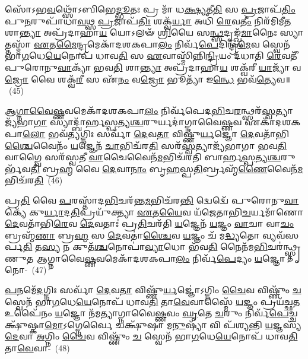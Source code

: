 𑌸𑍋᳴\-𑌽𑌭\-\ul{𑌵}\-𑌥𑍍𑌸𑍋᳴\-𑌽𑌬𑌿𑌭𑍇\-\ul{𑌦𑍍𑌭𑍂}\-𑌤𑌃 𑌪𑍍𑌰 𑌮𑌾᳴ 𑌧\-\ul{𑌕𑍍𑌷𑍍𑌯}\-𑌤𑍀\-\ul{𑌤𑌿} 𑌸 \ul{𑌪𑍍𑌰}\-𑌜𑌾𑌪᳴\-\ul{𑌤𑌿𑌂} 𑌪𑍁\-\ul{𑌨}\-𑌰𑍁𑌪𑌾᳴𑌧𑌾\-\ul{𑌵}\-𑌥𑍍𑌸 \ul{𑌪𑍍𑌰}\-𑌜𑌾𑌪᳴\-\ul{𑌤𑌿𑌃} 𑌶𑌕𑍍𑌵᳴\-\ul{𑌰𑍍𑌯𑌾} 𑌅𑌧𑌿᳴ \ul{𑌰𑍇}\-𑌵\-\ul{𑌤𑍀𑌂} 𑌨𑌿𑌰᳴𑌮𑌿𑌮𑍀\-\ul{𑌤} 𑌶𑌾\-\ul{𑌨𑍍𑌤𑍍𑌯𑌾} 𑌅𑌪𑍍𑌰᳴𑌦𑌾𑌹𑌾\-\ul{𑌯} 𑌯𑍋\-𑌽𑌲𑍟᳴ \ul{𑌶𑍍𑌰𑌿}\-𑌯𑍈 𑌸\-\ul{𑌨𑍍𑌥𑍍𑌸}\-𑌦𑍃𑌙𑍍𑌖𑍍𑌸᳴\-\ul{𑌮𑌾}\-𑌨𑍈𑌃 𑌸𑍍𑌯𑌾𑌤𑍍𑌤𑌸𑍍𑌮𑌾᳴ \ul{𑌏}\-𑌤\-\ul{𑌮𑍈}\-𑌨𑍍𑌦𑍍𑌰𑌮𑍇𑌕𑌾᳴\-𑌦𑌶\-𑌕𑌪𑌾\-\ul{𑌲𑌂} 𑌨𑌿𑌰𑍍𑌵᳴\-\ul{𑌪𑍇}\-𑌦𑌿𑌨𑍍𑌦𑍍𑌰᳴\-\ul{𑌮𑍇}\-𑌵 𑌸𑍍𑌵𑍇𑌨᳴ 𑌭𑌾\-\ul{𑌗}\-𑌧𑍇\-\ul{𑌯𑍇}\-𑌨𑍋𑌪᳴ 𑌧𑌾𑌵\-\ul{𑌤𑌿} 𑌸 \ul{𑌏}\-𑌵𑌾𑌸𑍍𑌮𑌿᳴𑌨𑍍𑌨𑌿\-\ul{𑌨𑍍𑌦𑍍𑌰𑌿}\-𑌯𑌂 𑌦᳴𑌧𑌾𑌤𑌿 \ul{𑌰𑍇}\-𑌵𑌤𑍀᳴ 𑌪𑍁𑌰𑍋𑌨𑍁\-\ul{𑌵𑌾}\-𑌕𑍍𑌯𑌾᳴ 𑌭𑌵\-\ul{𑌤𑌿} 𑌶𑌾\-\ul{𑌨𑍍𑌤𑍍𑌯𑌾} 𑌅𑌪𑍍𑌰᳴𑌦𑌾𑌹𑌾\-\ul{𑌯} 𑌶𑌕𑍍𑌵᳴𑌰𑍀 \ul{𑌯𑌾}\-𑌜𑍍𑌯𑌾᳴ 𑌵\-\ul{𑌜𑍍𑌰𑍋} 𑌵𑍈 𑌶𑌕𑍍𑌵᳴\-\ul{𑌰𑍀} 𑌸 𑌏᳴\-\ul{𑌨𑌂} 𑌵\-\ul{𑌜𑍍𑌰𑍋} 𑌭𑍂𑌤𑍍𑌯𑌾᳴ 𑌇\-\ul{𑌨𑍍𑌧𑍇} 𑌭𑌵᳴\-\ul{𑌤𑍍𑌯𑍇}\-𑌵॥~(45)

{\anuvakamend[{𑌅\-\ul{𑌪𑌿} 𑌤𑍟 𑌸𑍍𑌯𑍁᳴𑌰𑍍𑌵𑍈𑌨𑍍𑌧 𑌭𑌵\-\ul{𑌤𑌿} 𑌚𑌤𑍁᳴𑌰𑍍𑌦𑌶 𑌚}]}%

\-\ul{𑌆}\-\-\ul{𑌗𑍍𑌨𑌾}\-\-\ul{𑌵𑍈}\-\-\ul{𑌷𑍍𑌣}\-𑌵𑌮𑍇𑌕𑌾᳴𑌦𑌶𑌕𑌪𑌾\-\ul{𑌲𑌂} 𑌨𑌿𑌰𑍍𑌵᳴𑌪𑍇𑌦\-\ul{𑌭𑌿}\-𑌚\-\ul{𑌰}\-𑌨𑍍𑌥𑍍𑌸𑌰᳴\-\ul{𑌸𑍍𑌵}\-𑌤𑍍𑌯𑌾𑌜𑍍𑌯᳴\-𑌭𑌾\-\ul{𑌗𑌾} 𑌸𑍍𑌯𑌾𑌦𑍍𑌬𑌾᳴𑌰𑍍\mbox{}𑌹\-\ul{𑌸𑍍𑌪}\-𑌤𑍍𑌯\-\ul{𑌶𑍍𑌚}\-𑌰𑍁𑌰𑍍𑌯𑌦𑌾॑𑌗𑍍𑌨𑌾𑌵𑍈\-\ul{𑌷𑍍𑌣}\-𑌵 𑌏𑌕𑌾᳴\-𑌦𑌶\-𑌕𑌪𑌾\-\ul{𑌲𑍋} 𑌭𑌵᳴\-\ul{𑌤𑍍𑌯}\-𑌗𑍍𑌨𑌿𑌃 𑌸𑌰𑍍𑌵𑌾᳴ \ul{𑌦𑍇}\-𑌵\-\ul{𑌤𑌾} 𑌵𑌿𑌷𑍍𑌣𑍁᳴\-\ul{𑌰𑍍𑌯}\-𑌜𑍍𑌞𑍋 \ul{𑌦𑍇}\-𑌵𑌤𑌾᳴𑌭𑌿\-\ul{𑌶𑍍𑌚𑍈}\-𑌵𑍈𑌨𑌂᳴ \ul{𑌯}\-𑌜𑍍𑌞𑍇𑌨᳴ \ul{𑌚𑌾}\-𑌭𑌿𑌚᳴𑌰\-\ul{𑌤𑌿} 𑌸𑌰᳴\-\ul{𑌸𑍍𑌵}\-𑌤𑍍𑌯𑌾𑌜𑍍𑌯᳴𑌭𑌾𑌗𑌾 𑌭𑌵\-\ul{𑌤𑌿} 𑌵𑌾𑌗𑍍𑌵𑍈 𑌸𑌰᳴𑌸𑍍𑌵𑌤𑍀 \ul{𑌵𑌾}\-𑌚𑍈𑌵𑍈𑌨᳴\-\ul{𑌮}\-𑌭𑌿𑌚᳴𑌰𑌤𑌿 𑌬𑌾𑌰𑍍\mbox{}𑌹\-\ul{𑌸𑍍𑌪}\-𑌤𑍍𑌯\-\ul{𑌶𑍍𑌚}\-𑌰𑍁𑌰𑍍𑌭᳴𑌵\-\ul{𑌤𑌿} 𑌬𑍍𑌰\-\ul{𑌹𑍍𑌮} 𑌵𑍈 \ul{𑌦𑍇}\-𑌵𑌾\-\ul{𑌨𑌾𑌂} 𑌬𑍃\-\ul{𑌹}\-𑌸𑍍𑌪\-\ul{𑌤𑌿}\-𑌰𑍍𑌬𑍍𑌰𑌹𑍍𑌮᳴\-\ul{𑌣𑍈}\-𑌵𑍈𑌨᳴\-\ul{𑌮}\-𑌭𑌿𑌚᳴𑌰\-\ul{𑌤𑌿}\-~(46)

𑌪𑍍𑌰\-\ul{𑌤𑌿} 𑌵𑍈 \ul{𑌪}\-𑌰𑌸𑍍𑌤𑌾᳴𑌦\-\ul{𑌭𑌿}\-𑌚𑌰᳴𑌨𑍍𑌤\-\ul{𑌮}\-𑌭𑌿𑌚᳴𑌰\-\ul{𑌨𑍍𑌤𑌿} 𑌦𑍍𑌵𑍇𑌦𑍍𑌵𑍇᳴ 𑌪𑍁𑌰𑍋𑌨𑍁\-\ul{𑌵𑌾}\-𑌕𑍍𑌯𑍇᳴ 𑌕𑍁\-\ul{𑌰𑍍𑌯𑌾}\-𑌦\-\ul{𑌤𑌿}\-𑌪𑍍𑌰𑌯𑍁᳴𑌕𑍍𑌤𑍍𑌯𑌾 \ul{𑌏}\-𑌤\-\ul{𑌯𑍈}\-𑌵 𑌯᳴𑌜𑍇𑌤𑌾𑌭𑌿\-\ul{𑌚}\-𑌰𑍍𑌯𑌮𑌾᳴𑌣𑍋 \ul{𑌦𑍇}\-𑌵𑌤𑌾᳴𑌭𑌿\-\ul{𑌰𑍇}\-𑌵 \ul{𑌦𑍇}\-𑌵𑌤𑌾𑌃॑ 𑌪𑍍𑌰\-\ul{𑌤𑌿}\-𑌚𑌰᳴𑌤𑌿 \ul{𑌯}\-𑌜𑍍𑌞𑍇𑌨᳴ \ul{𑌯}\-𑌜𑍍𑌞𑌂 \ul{𑌵𑌾}\-𑌚𑌾 𑌵𑌾\-\ul{𑌚𑌂} 𑌬𑍍𑌰𑌹𑍍𑌮᳴\-\ul{𑌣𑌾} 𑌬𑍍𑌰\-\ul{𑌹𑍍𑌮} 𑌸 \ul{𑌦𑍇}\-𑌵𑌤𑌾॑\-\ul{𑌶𑍍𑌚𑍈}\-𑌵 \ul{𑌯}\-𑌜𑍍𑌞𑌂 𑌚᳴ 𑌮\-\ul{𑌦𑍍𑌧𑍍𑌯}\-𑌤𑍋 𑌵𑍍𑌯𑌵᳴𑌸𑌰𑍍𑌪\-\ul{𑌤𑌿} 𑌤\-\ul{𑌸𑍍𑌯} 𑌨 𑌕𑍁𑌤᳴\-\ul{𑌶𑍍𑌚}\-𑌨𑍋𑌪𑌾॑\-\ul{𑌵𑍍𑌯𑌾}\-𑌧𑍋 𑌭᳴𑌵\-\ul{𑌤𑌿} 𑌨𑍈𑌨᳴𑌮\-\ul{𑌭𑌿}\-𑌚𑌰॑𑌨𑍍𑌥𑍍𑌸𑍍𑌤𑍃𑌣𑍁𑌤 𑌆𑌗𑍍𑌨𑌾𑌵𑍈\-\ul{𑌷𑍍𑌣}\-𑌵𑌮𑍇𑌕𑌾᳴\-𑌦𑌶\-𑌕𑌪𑌾\-\ul{𑌲𑌂} 𑌨𑌿𑌰𑍍𑌵᳴\-\ul{𑌪𑍇}\-𑌦𑍍𑌯𑌂 \ul{𑌯}\-𑌜𑍍𑌞𑍋 𑌨𑍋-~(47)

\-\ul{𑌪}\-𑌨𑌮𑍇᳴\-\ul{𑌦}\-𑌗𑍍𑌨𑌿𑌃 𑌸𑌰𑍍𑌵𑌾᳴ \ul{𑌦𑍇}\-𑌵\-\ul{𑌤𑌾} 𑌵𑌿𑌷𑍍𑌣𑍁᳴\-\ul{𑌰𑍍𑌯}\-𑌜𑍍𑌞𑍋॑\-𑌽𑌗𑍍𑌨𑌿𑌂 \ul{𑌚𑍈}\-𑌵 𑌵𑌿𑌷𑍍𑌣𑍁𑌂᳴ \ul{𑌚} 𑌸𑍍𑌵𑍇𑌨᳴ 𑌭𑌾\-\ul{𑌗}\-𑌧𑍇\-\ul{𑌯𑍇}\-𑌨𑍋𑌪᳴ 𑌧𑌾𑌵\-\ul{𑌤𑌿} 𑌤𑌾\-\ul{𑌵𑍇}\-𑌵𑌾𑌸𑍍𑌮𑍈᳴ \ul{𑌯}\-𑌜𑍍𑌞𑌂 𑌪𑍍𑌰𑌯᳴𑌚𑍍𑌛\-\ul{𑌤} 𑌉𑌪𑍈᳴𑌨𑌂 \ul{𑌯}\-𑌜𑍍𑌞𑍋 𑌨᳴𑌮𑌤𑍍𑌯𑌾𑌗𑍍𑌨𑌾𑌵𑍈\-\ul{𑌷𑍍𑌣}\-𑌵𑌂 \ul{𑌘𑍃}\-𑌤𑍇 \ul{𑌚}\-𑌰𑍁𑌂 𑌨𑌿𑌰𑍍𑌵᳴\-\ul{𑌪𑍇}\-𑌚𑍍𑌚𑌕𑍍𑌷𑍁᳴𑌷𑍍𑌕𑌾\-\ul{𑌮𑍋}\-\-𑌽𑌗𑍍𑌨𑍇𑌰𑍍𑌵𑍈 𑌚𑌕𑍍𑌷𑍁᳴𑌷𑌾 𑌮\-\ul{𑌨𑍁}\-𑌷𑍍𑌯𑌾᳴ 𑌵𑌿 𑌪᳴𑌶𑍍𑌯𑌨𑍍𑌤𑌿 \ul{𑌯}\-𑌜𑍍𑌞𑌸𑍍𑌯᳴ \ul{𑌦𑍇}\-𑌵𑌾 \ul{𑌅}\-𑌗𑍍𑌨𑌿𑌂 \ul{𑌚𑍈}\-𑌵 𑌵𑌿𑌷𑍍𑌣𑍁𑌂᳴ \ul{𑌚} 𑌸𑍍𑌵𑍇𑌨᳴ 𑌭𑌾\-\ul{𑌗}\-𑌧𑍇\-\ul{𑌯𑍇}\-𑌨𑍋𑌪᳴ 𑌧𑌾𑌵\-\ul{𑌤𑌿} 𑌤𑌾\-\ul{𑌵𑍇}\-𑌵𑌾-~(48)

